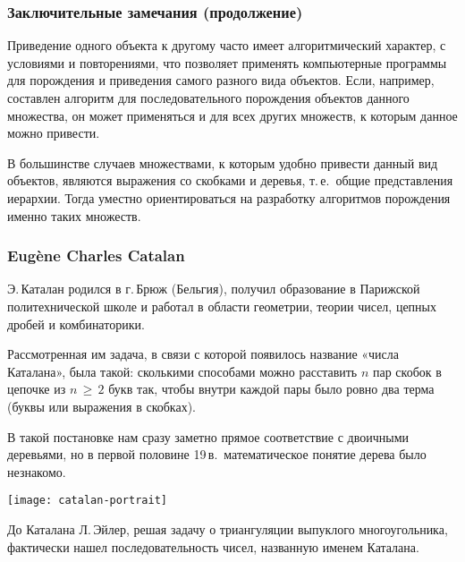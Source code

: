 \documentclass[mathserif]{beamer}
\begin{document}
\begin{frame}[fragile]%
 \frametitle{Заключительные замечания (продолжение)}
\small
Приведение одного объекта к другому часто имеет алгоритмический характер, с условиями и повторениями, что позволяет применять компьютерные программы для порождения и приведения самого разного вида объектов.
Если, например, составлен алгоритм для последовательного порождения объектов данного множества, он может применяться и для всех других множеств, к которым данное можно привести.

\bigskip

В большинстве случаев множествами, к которым удобно привести данный вид объектов, являются выражения со скобками и деревья, т.\,е.\ общие представления иерархии.
Тогда уместно ориентироваться на разработку алгоритмов порождения именно таких множеств.
\end{frame}

\begin{frame}[fragile]%
\frametitle{Eugène Charles Catalan}
\begin{minipage}{.67\textwidth}
\small
Э.\,Каталан родился в г.\,Брюж (Бельгия), получил образование в Парижской политехнической школе и работал в области геометрии, те\-ории чисел, цепных дробей и комбинаторики.

\medskip

Рассмотренная им задача, в связи с которой появилось название «числа Каталана», была такой: сколькими способами можно расставить $n$ пар скобок в цепочке из $n\,{\ge}\,2$ букв так, чтобы внутри каждой пары было ровно два терма (буквы или выражения в скобках).

\medskip

В такой постановке нам сразу заметно прямое соответствие с двоичными деревьями, но в первой половине 19\,в.\ математическое понятие дерева было незнакомо.
\end{minipage}\hfill%
\begin{minipage}{.30\textwidth}
\texttt{[image: catalan-portrait]}
\end{minipage}

\bigskip

До Каталана Л.\,Эйлер, решая задачу о триангуляции выпуклого многоугольника, фактически нашел последовательность чисел, названную именем Каталана.
\end{frame}
\end{document}
